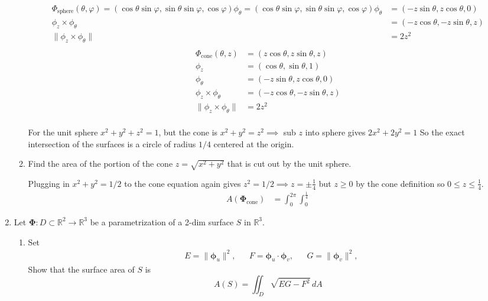 \documentclass{article}
\newcommand{\norm}[1]{\| #1 \|}
\begin{document}
\begin{enumerate}
\begin{enumerate}
        \begin{align*} 
            \Phi_{\text{sphere}} (\theta, \varphi) = (\cos \theta \sin \varphi, \sin \theta \sin \varphi, \cos \varphi)
            \phi_{\theta} = (\cos \theta \sin \varphi, \sin \theta \sin \varphi, \cos \varphi)
            \phi_{\theta} &= (-z \sin \theta, z\cos \theta, 0) \\
            \phi_{z} \times \phi_{\theta} &= (-z\cos \theta, -z\sin \theta, z)  \\
            \norm{\phi_{z} \times \phi_{\theta}} &= 2z^2  \\
        \end{align*}
        \begin{align*} 
            \Phi_{\text{cone}} (\theta, z) &= (z\cos \theta , z\sin \theta, z)  \\
            \phi_{z} &= (\cos \theta, \sin \theta, 1) \\
            \phi_{\theta} &= (-z \sin \theta, z\cos \theta, 0) \\
            \phi_{z} \times \phi_{\theta} &= (-z\cos \theta, -z\sin \theta, z)  \\
            \norm{\phi_{z} \times \phi_{\theta}} &= 2z^2  \\
        \end{align*}
        
        For the unit sphere $x^2 + y^2 + z^2 = 1$, but the cone is $ x^2 + y^2 = z^2 \implies $ sub $z$ into sphere gives $2x^2 + 2y^2 = 1$
        So the exact intersection of the surfaces is a circle of radius $1/4$ centered at the origin.

        \item Find the area of the portion of the cone $z = \sqrt{x^2+y^2}$ that is cut out by the unit sphere.
        
        Plugging in $x^2 +y^2 = 1/2$ to the cone equation again gives $z^2 = 1/2 \implies z = \pm \frac{1}{4}$ but $z \geq 0$ by the cone definition so $0 \leq z \leq \frac{1}{4}$.
        \begin{align*}
            A(\boldsymbol \Phi_{\text{cone}}) &= \int_0^{2\pi}\int_0^{\frac{1}{4}} 
        \end{align*}
    \end{enumerate}

    \item Let $\boldsymbol \Phi : D \subset \mathbb{R}^2 \rightarrow \mathbb{R}^3$ be a parametrization of a 2-dim surface $S$ in $\mathbb{R}^3$.
    \begin{enumerate}
        \item Set
        \begin{align*}
            & E = \norm{\boldsymbol \phi_u}^2,& &F = \boldsymbol \phi_u \cdot \boldsymbol \phi_v, & & G = \norm{\boldsymbol \phi_v}^2,
        \end{align*} 
        Show that the surface area of $S$ is 
        \[ A(S) = \iint_D \sqrt{EG - F^2}\,dA \]
        

\end{enumerate}
\end{enumerate}
\end{document}
